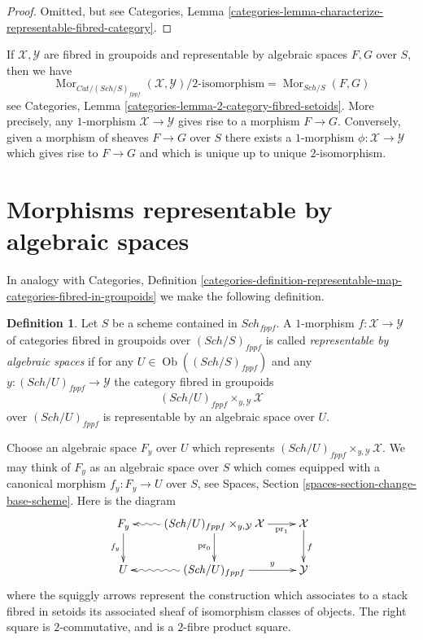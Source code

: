 \documentclass{stacks-project}
\theoremstyle{plain}
\theoremstyle{definition}
\newtheorem{definition}[subsection]{Definition}
\theoremstyle{remark}
\numberwithin{equation}{subsection}
\def\Sch{\mathit{Sch}}
\def\Mor{\mathop{\mathrm{Mor}}\nolimits}
\def\Ob{\mathop{\mathrm{Ob}}\nolimits}
\begin{document}
\begin{proof}
Omitted, but see Categories,
Lemma \ref{categories-lemma-characterize-representable-fibred-category}.
\end{proof}

\noindent
If $\mathcal{X}, \mathcal{Y}$ are fibred in groupoids and
representable by algebraic spaces $F, G$ over $S$, then we have
\begin{equation}
\label{equation-morphisms-spaces}
\Mor_{\textit{Cat}/(\Sch/S)_{fppf}}(\mathcal{X}, \mathcal{Y})
\Big/
2\text{-isomorphism}
=
\Mor_{\Sch/S}(F, G)
\end{equation}
see
Categories, Lemma \ref{categories-lemma-2-category-fibred-setoids}.
More precisely, any $1$-morphism $\mathcal{X} \to \mathcal{Y}$
gives rise to a morphism $F \to G$. Conversely, given a morphism
of sheaves $F \to G$ over $S$ there exists a $1$-morphism
$\phi : \mathcal{X} \to \mathcal{Y}$ which gives rise to $F \to G$
and which is unique up to unique $2$-isomorphism.



\section{Morphisms representable by algebraic spaces}
\label{section-morphisms-representable-by-algebraic-spaces}

\noindent
In analogy with Categories, Definition
\ref{categories-definition-representable-map-categories-fibred-in-groupoids}
we make the following definition.

\begin{definition}
\label{definition-representable-by-algebraic-spaces}
Let $S$ be a scheme contained in $\Sch_{fppf}$.
A $1$-morphism $f : \mathcal{X} \to \mathcal{Y}$ of
categories fibred in groupoids over $(\Sch/S)_{fppf}$
is called {\it representable by algebraic spaces} if
for any $U \in \Ob((\Sch/S)_{fppf})$
and any $y : (\Sch/U)_{fppf} \to \mathcal{Y}$
the category fibred in groupoids
$$
(\Sch/U)_{fppf} \times_{y, \mathcal{Y}} \mathcal{X}
$$
over $(\Sch/U)_{fppf}$
is representable by an algebraic space over $U$.
\end{definition}

\noindent
Choose an algebraic space $F_y$ over $U$ which represents
$(\Sch/U)_{fppf} \times_{y, \mathcal{Y}} \mathcal{X}$.
We may think of $F_y$ as an algebraic space over $S$
which comes equipped with a canonical morphism $f_y : F_y \to U$
over $S$, see
Spaces, Section \ref{spaces-section-change-base-scheme}.
Here is the diagram
\begin{equation}
\label{equation-representable-by-algebraic-spaces}
\vcenter{
\xymatrix{
F_y \ar[d]_{f_y} &
(\Sch/U)_{fppf} \times_{y, \mathcal{Y}} \mathcal{X}
\ar@{~>}[l] \ar[d]_{\text{pr}_0} \ar[r]_-{\text{pr}_1} &
\mathcal{X} \ar[d]^f \\
U &
(\Sch/U)_{fppf} \ar@{~>}[l] \ar[r]^-y &
\mathcal{Y}
}
}
\end{equation}
where the squiggly arrows represent the construction which associates
to a stack fibred in setoids its associated sheaf of isomorphism classes
of objects. The right square is
$2$-commutative, and is a $2$-fibre product square.
\end{document}
